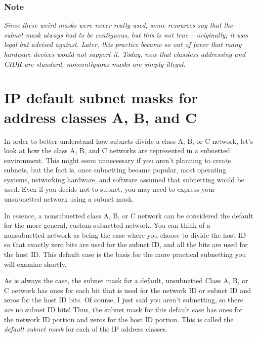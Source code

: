 \subsubsection[Note]{\texorpdfstring{\protect\hypertarget{ch18s03.htmlux5cux23note-70}{}{}Note}{Note}}

{\emph{Since these weird masks were never really used, some resources
say that the subnet mask always had to be contiguous, but this is not
true -- originally, it was legal but advised against. Later, this
practice became so out of favor that many hardware devices would not
support it. Today, now that classless addressing and CIDR are standard,
noncontiguous masks are simply
illegal}}\protect\hypertarget{ch18s03.htmlux5cux23idx-CHP-18-0732}{}{}.




\section{IP default subnet masks for address classes A, B, and C}

In order to better understand how subnets divide a class A, B, or C network, let's
look at how the class A, B, and C networks are represented in a
subnetted environment. This might seem unnecessary if you aren't
planning to create subnets, but the fact is, once subnetting became
popular, most operating systems, networking hardware, and software
assumed that subnetting would be used. Even if you decide not to subnet,
you may need to express your unsubnetted network using a subnet mask.

In essence, a nonsubnetted class A, B, or C network can be considered
the default for the more general, custom-subnetted network. You can
think of a nonsubnetted network as being the case where you choose to
divide the host ID so that exactly zero bits are used for the subnet ID,
and all the bits are used for the host ID. This default case is the
basis for the more practical subnetting you will examine shortly.

As is always the case, the subnet mask for a default, unsubnetted Class
A, B, or C network has ones for each bit that is used for the network ID
or subnet ID and zeros for the host ID bits. Of course, I just said you
aren't subnetting, so there {\emph{are}} no subnet ID bits! Thus, the
subnet mask for this default case has ones for the network ID portion
and zeros for the host ID portion. This is called the {\emph{default
subnet mask}} for each of the IP address classes.

